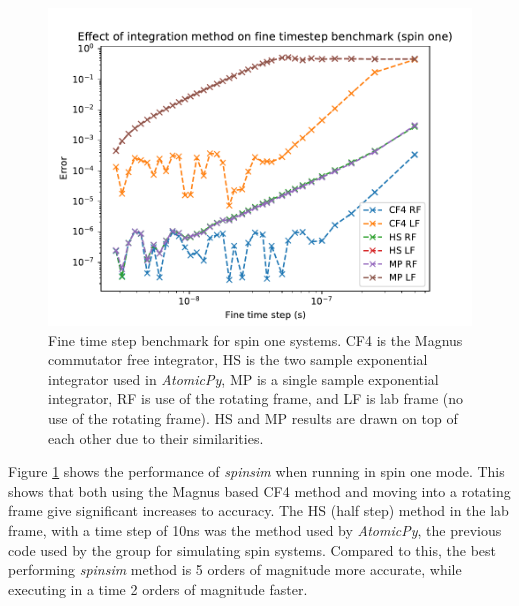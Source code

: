 \documentclass{jors}
\begin{document}
			\begin{figure}[h!]
				\includegraphics[scale=0.9]{benchmark_comparison_spin_one_publication.pdf}
				\caption{Fine time step benchmark for spin one systems. CF4 is the Magnus commutator free integrator, HS is the two sample exponential integrator used in \emph{AtomicPy}, MP is a single sample exponential integrator, RF is use of the rotating frame, and LF is lab frame (no use of the rotating frame). HS and MP results are drawn on top of each other due to their similarities.}
				\label{fig:benchmark_comparison_spin_one}
			\end{figure}

			Figure \ref{fig:benchmark_comparison_spin_one} shows the performance of \emph{spinsim} when running in spin one mode. This shows that both using the Magnus based CF4 method and moving into a rotating frame give significant increases to accuracy. The HS (half step) method in the lab frame, with a time step of 10ns was the method used by \emph{AtomicPy}, the previous code used by the group for simulating spin systems. Compared to this, the best performing \emph{spinsim} method is 5 orders of magnitude more accurate, while executing in a time 2 orders of magnitude faster.\\
\end{document}
